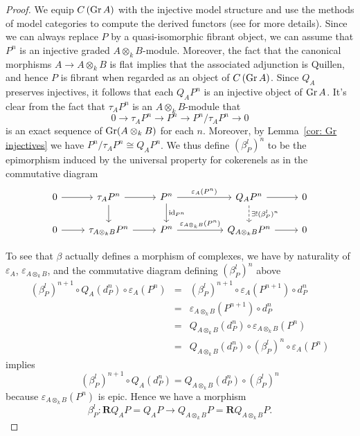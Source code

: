 \begin{proof}
  We equip \(C\left(\operatorname{Gr}A\right)\) with the injective model structure and use the methods of model categories to compute the derived functors (see \textcite{Hovey01} for more details).
  Since we can always replace \(P\) by a quasi-isomorphic fibrant object, we can assume that \(P^n\) is an injective graded \(A \otimes_k B\)-module.
  Moreover, the fact that the canonical morphisms \(A \to A \otimes_k B\) is flat implies that the associated adjunction is Quillen, and hence \(P\) is fibrant when regarded as an object of  \(C\left(\operatorname{Gr}A\right)\).
  Since \(Q_A\) preserves injectives, it follows that each \(Q_A P^n\) is an injective object of \(\operatorname{Gr}A\).
  It's clear from the fact that \(\tau_A P^n\) is an \(A \otimes_k B\)-module that   \[0 \to \tau_A P^n \to P^n \to P^n/\tau_A P^n \to 0\]
  is an exact sequence of \(\operatorname{Gr}(A \otimes_k B)\) for each \(n\).
  Moreover, by Lemma~\ref{cor: Gr injectives} we have \(P^n/\tau_A P^n \cong Q_A P^n\).
  We thus define \((\beta^l_P)^n\) to be the epimorphism induced by the universal property for cokerenels as in the commutative diagram
  \[\begin{tikzcd}
  0 \arrow{r} & \tau_{A} P^n \arrow{d}\arrow{r} & P^n \arrow{d}{\id_{P^n}}\arrow{rr}{\varepsilon_{A}(P^n)} && Q_{A} P^n \arrow{r}\arrow[dashed]{d}{\exists ! (\beta^l_P)^n} & 0\\
  0 \arrow{r} & \tau_{A \otimes_k B} P^n \arrow{r} & P^n\arrow{rr}{\varepsilon_{A \otimes_k B}(P^n)} && Q_{A \otimes_k B} P^n \arrow{r} & 0 
  \end{tikzcd}\]

  To see that \(\beta\) actually defines a morphism of complexes, we have by naturality of \(\varepsilon_A\), \(\varepsilon_{A \otimes_k B}\), and the commutative diagram defining \((\beta^l_P)^n\) above 
  \begin{eqnarray*}
    (\beta^l_P)^{n+1} \circ Q_{A}(d^n_{P}) \circ \varepsilon_{A}(P^n)
    &=& (\beta^l_P)^{n+1} \circ \varepsilon_{A}(P^{n+1}) \circ d^n_{P}\\
    &=& \varepsilon_{A \otimes_k B}(P^{n+1}) \circ d^n_{P}\\
    &=& Q_{A \otimes_k B}(d_{P}^n) \circ \varepsilon_{A \otimes_k B}(P^n)\\
    &=& Q_{A \otimes_k B}(d_{P}^n) \circ (\beta^l_P)^n \circ \varepsilon_{A}(P^n)
  \end{eqnarray*}
  implies
  \[(\beta^l_P)^{n+1} \circ Q_{A}(d^n_{P}) = Q_{A \otimes_k B}(d^n_{P}) \circ (\beta^l_P)^n\]
  because \(\varepsilon_{A \otimes_k B}(P^n)\) is epic. Hence we have a morphism
  \[\beta^l_P \colon \mathbf{R}Q_{A} P = Q_{A} P \to Q_{A \otimes_k B} P = \mathbf{R}Q_{A \otimes_k B} P.\]


\end{proof}

